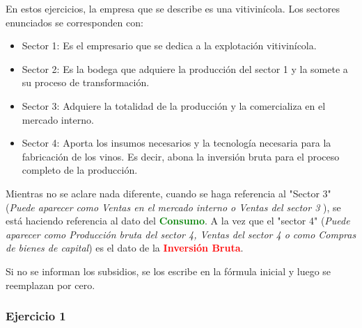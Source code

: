 \documentclass[12pt,a4paper]{article}
\begin{document}
        \par{\hspace{0.5cm}
        	En estos ejercicios, la empresa que se describe es una vitivinícola.
            Los sectores enunciados se corresponden con:
            \begin{itemize}
				\item Sector 1: Es el empresario que se dedica a la explotación vitivinícola.
                
                \item Sector 2: Es la bodega que adquiere la producción del sector 1 y la somete a su proceso de transformación.
                
                \item Sector 3: Adquiere la totalidad de la producción y la comercializa en el mercado interno.
                
                \item Sector 4: Aporta los insumos necesarios y la tecnología necesaria para la fabricación de los vinos. Es decir, abona la inversión bruta para el proceso completo de la producción.
                
			\end{itemize}
            
            Mientras no se aclare nada diferente, cuando se haga referencia al "Sector 3" (\textsl{Puede aparecer como Ventas en el mercado interno o Ventas del sector 3 }), se está haciendo referencia al dato del \textcolor{green}{\textbf{Consumo}}.
            A la vez que el "sector 4" (\textsl{Puede aparecer como Producción bruta del sector 4, Ventas del sector 4 o como Compras de bienes de capital}) es el dato de la \textcolor{red}{\textbf{Inversión Bruta}}.
            
            Si no se informan los subsidios, se los escribe en la fórmula inicial y luego se reemplazan por cero.
	        }
        
    
    	\subsubsection{Ejercicio 1}
        
\end{document}

